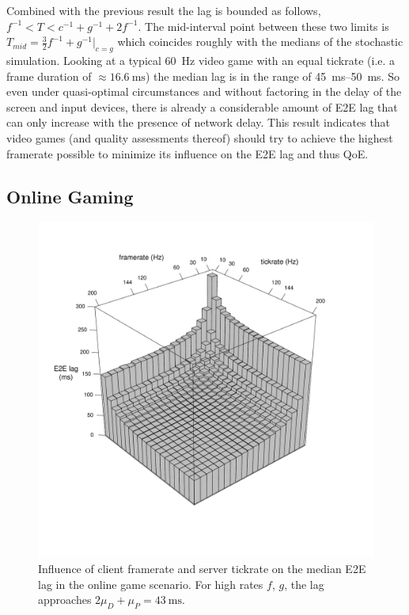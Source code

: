 Combined with the previous result the lag is bounded as follows, $f^{-1} < T < c^{-1}+g^{-1}+2f^{-1}$. The mid-interval point between these two limits is $T_{mid}=\frac{3}{2} f^{-1} + g^{-1}|_{c=g}$ which coincides roughly with the medians of the stochastic simulation. Looking at a typical \SI{60}{\hertz} video game with an equal tickrate (i.e. a frame duration of $\approx \SI{16.6}{\milli\second}$) the median lag is in the range of \SIrange{45}{50}{\milli\second}. So even under quasi-optimal circumstances and without factoring in the delay of the screen and input devices, there is already a considerable amount of \gls{E2E} lag that can only increase with the presence of network delay. This result indicates that video games (and quality assessments thereof) should try to achieve the highest framerate possible to minimize its influence on the \gls{E2E} lag and thus \gls{QoE}.

\subsection{Online Gaming}


\begin{figure}[!t]
	\centering
	\vspace{-6mm}
	\includegraphics[width=1.0\columnwidth]{../../../simulation/visualization/e2e-lag-3dbars.pdf}
	\vspace{-15mm}
	\caption{Influence of client framerate and server tickrate on the median \gls{E2E} lag in the online game scenario. For high rates $f$, $g$, the lag approaches $2\mu_D+\mu_P=\SI{43}{\milli\second}$.}
\label{fig:3dbars-framerate-tickrate-lag}
\end{figure}

